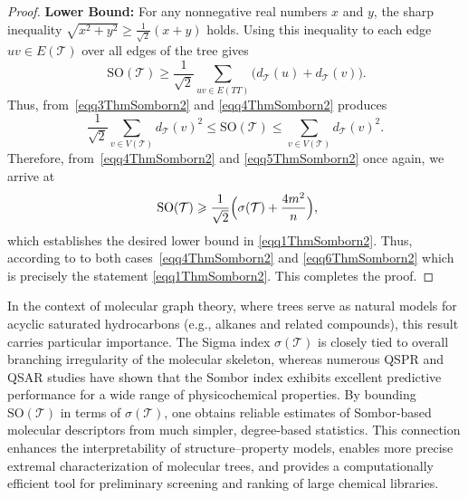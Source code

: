 \documentclass[12pt, a4paper]{article}
\newcommand{\TT}{\mathcal{T}}
\newcommand{\SO}{\mathrm{SO}}
\begin{document}
\begin{proof}
\noindent\textbf{Lower Bound:} For any nonnegative real numbers $x$ and $y$, the sharp inequality
$ \sqrt{x^2 + y^2} \geqslant \frac{1}{\sqrt{2}}(x+y)$ holds. Using this inequality to each edge $uv \in E(\TT)$ over all edges of the tree gives
\begin{equation}~\label{eqq5ThmSomborn2}
\SO(\TT) \geqslant \frac{1}{\sqrt{2}} \sum_{uv \in E(TT)} \bigl( d_{\TT}(u)+d_{\TT}(v)\bigr).
\end{equation}
Thus, from~\eqref{eqq3ThmSomborn2} and \eqref{eqq4ThmSomborn2} produces
\[
\frac{1}{\sqrt{2}} \sum_{v\in V(\TT)} d_\TT(v)^2
\leq \SO(\TT)
\leq \sum_{v\in V(\TT)} d_\TT(v)^2.
\]
Therefore, from~\eqref{eqq4ThmSomborn2} and \eqref{eqq5ThmSomborn2} once again, we arrive at
\begin{equation}~\label{eqq6ThmSomborn2}
\SO(\TT) \geqslant \frac{1}{\sqrt{2}} \Bigl(\sigma(\TT)+\frac{4m^2}{n}\Bigr),
\end{equation}
which establishes the desired lower bound in \eqref{eqq1ThmSomborn2}. Thus, according to to both cases~\eqref{eqq4ThmSomborn2} and \eqref{eqq6ThmSomborn2}
which is precisely the statement \eqref{eqq1ThmSomborn2}. This completes the proof.
\end{proof}
In the context of molecular graph theory, where trees serve as natural models for acyclic saturated hydrocarbons (e.g., alkanes and related compounds), this result carries particular importance. The Sigma index $\sigma(\TT)$ is closely tied to overall branching irregularity of the molecular skeleton, whereas numerous QSPR and QSAR studies have shown that the Sombor index exhibits excellent predictive performance for a wide range of physicochemical properties. By bounding $\SO(\TT)$ in terms of $\sigma(\TT)$, one obtains reliable estimates of Sombor-based molecular descriptors from much simpler, degree-based statistics. This connection enhances the interpretability of structure--property models, enables more precise extremal characterization of molecular trees, and provides a computationally efficient tool for preliminary screening and ranking of large chemical libraries.
\end{document}
